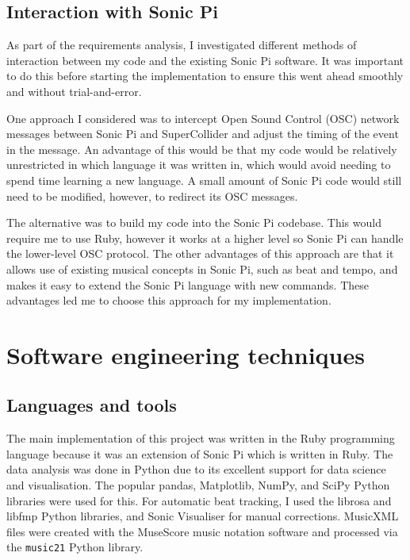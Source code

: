 \documentclass[12pt,twoside,openright]{report}
\begin{document}
\subsection{Interaction with Sonic Pi}

As part of the requirements analysis, I investigated different methods of
interaction between my code and the existing Sonic Pi software. It was important
to do this before starting the implementation to ensure this went ahead smoothly
and without trial-and-error.

One approach I considered was to intercept Open Sound Control (OSC) network
messages between Sonic Pi and SuperCollider and adjust the timing of the event
in the message. An advantage of this would be that my code would be relatively
unrestricted in which language it was written in, which would avoid needing to
spend time learning a new language. A small amount of Sonic Pi code would still
need to be modified, however, to redirect its OSC messages.

The alternative was to build my code into the Sonic Pi codebase. This would
require me to use Ruby, however it works at a higher level so Sonic Pi can
handle the lower-level OSC protocol. The other advantages of this approach are
that it allows use of existing musical concepts in Sonic Pi, such as beat and
tempo, and makes it easy to extend the Sonic Pi language with new commands.
These advantages led me to choose this approach for my implementation.



\section{Software engineering techniques} \label{software_engineering_techniques}

\subsection{Languages and tools} \label{languages_and_tools}

The main implementation of this project was written in the Ruby programming
language because it was an extension of Sonic Pi which is written in Ruby. The
data analysis was done in Python due to its excellent support for data science
and visualisation. The popular pandas, Matplotlib, NumPy, and SciPy Python
libraries were used for this. For automatic beat tracking, I used the librosa
and libfmp Python libraries, and Sonic Visualiser for manual corrections.
MusicXML files were created with the MuseScore music notation software and
processed via the \verb'music21' Python library.
\end{document}
